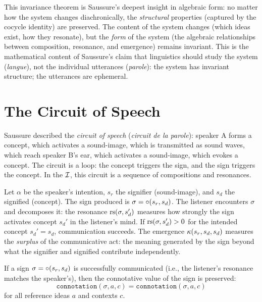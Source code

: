 \begin{interpretation}
This invariance theorem is Saussure's deepest insight in algebraic
form: no matter how the system changes diachronically, the
\emph{structural} properties (captured by the cocycle identity) are
preserved. The content of the system changes (which ideas exist, how
they resonate), but the \emph{form} of the system (the algebraic
relationships between composition, resonance, and emergence) remains
invariant. This is the mathematical content of Saussure's claim
that linguistics should study the system (\textit{langue}), not the
individual utterances (\textit{parole}): the system has invariant
structure; the utterances are ephemeral.
\end{interpretation}

\section{The Circuit of Speech}

Saussure described the \emph{circuit of speech} (\textit{circuit de
la parole}): speaker A forms a concept, which activates a
sound-image, which is transmitted as sound waves, which reach
speaker B's ear, which activates a sound-image, which evokes a
concept. The circuit is a loop: the concept triggers the sign, and
the sign triggers the concept. In the $\mathcal{I}$, this circuit is a
sequence of compositions and resonances.

\begin{example}
Let $\alpha$ be the speaker's intention, $s_r$ the signifier
(sound-image), and $s_d$ the signified (concept). The sign produced
is $\sigma = \circ(s_r, s_d)$. The listener encounters $\sigma$
and decomposes it: the resonance $\mathrm{rs}(\sigma, s_d')$ measures how
strongly the sign activates concept $s_d'$ in the listener's mind.
If $\mathrm{rs}(\sigma, s_d') > 0$ for the intended concept $s_d' = s_d$,
communication succeeds. The emergence
$\kappa(s_r, s_d, s_d)$ measures the \emph{surplus} of the
communicative act: the meaning generated by the sign beyond what the
signifier and signified contribute independently.
\end{example}

\begin{theorem}
\label{thm:communication-preserves}
If a sign $\sigma = \circ(s_r, s_d)$ is successfully communicated
(i.e., the listener's resonance matches the speaker's), then the
connotative value of the sign is preserved:
\[
  \texttt{connotation}(\sigma, a, c) = \texttt{connotation}(\sigma, a, c)
\]
for all reference ideas $a$ and contexts $c$.
\end{theorem}


